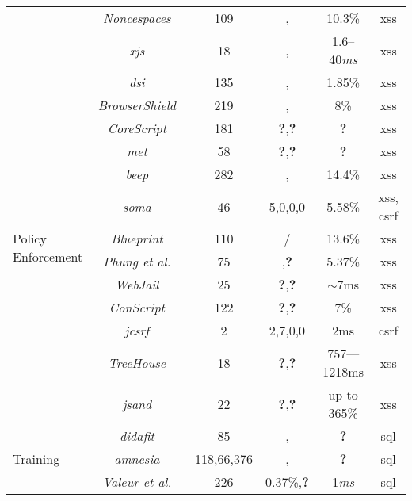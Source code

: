 \documentclass[conference]{IEEEtran}
\newcommand{\tick}{\ding{52}}
\newcommand{\xmark}{\ding{56}}
\begin{document}
\begin{table*}
\begin{threeparttable}
\begin{small}
{\begin{tabular}{l|c|c|cc|c}
	&  {\it Noncespaces}~\cite{GC09} & 109 & \tick,\tick &  10.3\% & {\sc xss} \\ 
    &  {\it x{\sc js}}~\cite{APKLM10} & 18 & \tick,\tick & 1.6--40{\it ms} & {\sc xss} \\
	\hline
	\hline    
	\multirow{13}{*}{Policy Enforcement}
	&   {\it {\sc dsi}}~\cite{NSS06} & 135 & \xmark,\xmark & 1.85\% & {\sc xss} \\ 
	&   {\it BrowserShield}~\cite{RDWDE07} & 219 & \tick,\tick & 8\% & {\sc xss} \\ 
	&   {\it CoreScript}~\cite{YCIS07} & 181 & {\bf ?},{\bf ?} &  {\bf ?} & {\sc xss} \\ 
	&   {\it {\sc met}}~\cite{ELX07} & 58 & {\bf ?},{\bf ?} &  {\bf ?} & {\sc xss} \\ 
    &   {\it {\sc beep}}~\cite{TNH07} & 282 & \tick,\tick & 14.4\% & {\sc xss} \\
    &   {\it {\sc soma}}~\cite{OWVS08} & 46 & 5,0,0,0 & 5.58\% & {\sc xss}, {\sc csrf}\\
	&   {\it Blueprint}~\cite{LV09} & 110 & \tick/\tick & 13.6\% & {\sc xss} \\ 
	&   {\it Phung et al.}~\cite{PSC09} & 75 & \xmark,{\bf ?} & 5.37\% & {\sc xss} \\
	&   {\it WebJail}~\cite{VDDPJ11} & 25 & {\bf ?},{\bf ?} & $\sim$7ms & {\sc xss} \\ 
	&   {\it ConScript}~\cite{ML10} & 122 & {\bf ?},{\bf ?} & 7\% & {\sc xss} \\
	&   {\it j{\sc csrf}}~\cite{PS11} & 2 & 2,7,0,0 & 2ms & {\sc csrf} \\
    &   {\it TreeHouse}~\cite{IW12} & 18 & {\bf ?},{\bf ?} & 757–--1218ms & {\sc xss} \\
   	&   {\it {\sc js}and}~\cite{AVBPDP12} & 22 & {\bf ?},{\bf ?} & up to 365\% & {\sc xss}\\
	\hline
	\hline  
        \multirow{12}{*}{Training}
    &   {\it {\sc didafit}}~\cite{LLW02} & 85 & \xmark,\xmark & {\bf ?} & {\sc sql} \\
	&   {\it {\sc amnesia}}~\cite{HO05,HO06,HO05b} & 118,66,376 & \tick,\tick & {\bf ?} & {\sc sql} \\ 
	&   {\it Valeur et al.}~\cite{VMV05} & 226 & 0.37\%,{\bf ?} & 1{\it ms} & {\sc sql} \\

\end{tabular}}
\end{small}
\end{threeparttable}
\end{table*}
\end{document}

